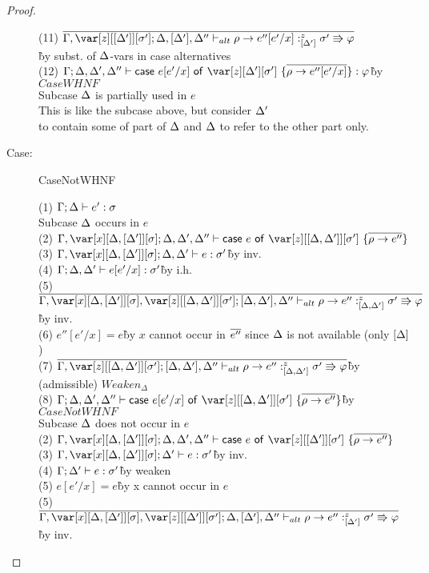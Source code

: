 \begin{proof}
\begin{description}
\begin{tabbing}
    (11) $\ov{\G,\z[\irr{\D'}][\s']; \D,[\D'],\D'' \vdash_{alt} \rho \to e''[e'/x] :^z_{\irr{\D'}} \s'\Rrightarrow\vp}$\\\` by subst. of $\Delta$-vars in case alternatives\\
    (12) $\G;\D,\D',\D'' \vdash \ccase{e[e'/x]}{\z[\D'][\s']~\{\ov{\rho \to e''[e'/x]}\}} : \vp$\` by $CaseWHNF$\\
    Subcase $\Delta$ is partially used in $e$\\
    This is like the subcase above, but consider $\Delta'$\\
    to contain some of part of $\Delta$ and $\Delta$ to refer to the other part only.
\end{tabbing}

\item[Case:] CaseNotWHNF
\begin{tabbing}
    (1) $\Gamma;\Delta\vdash e' :\sigma$\\
    Subcase $\Delta$ occurs in $e$\\
    (2) $\G,\xD; \D, \D', \D'' \vdash \ccase{e}{\z[\irr{\D,\D'}][\s']~\{\ov{\rho\to e''}\}}$\\
    (3) $\G,\xD; \D, \D' \vdash e : \s'$\` by inv.\\
    (4) $\Gamma; \Delta,\Delta' \vdash e[e'/x] : \sigma'$\` by i.h.\\
    (5) $\ov{\G,\xD,\z[\irr{\D,\D'}][\s']; [\D,\D'],\D'' \vdash_{alt} \rho \to e'' :^z_{\irr{\D,\D'}} \s'\Rrightarrow\vp}$\` by inv.\\
    (6) $e''[e'/x] = e$\` by $x$ cannot occur in $\overline{e''}$ since $\Delta$ is not available (only $\left[\Delta\right]$)\\
    (7) $\ov{\G,\z[\irr{\D,\D'}][\s']; [\D,\D'],\D'' \vdash_{alt} \rho \to e'' :^z_{\irr{\D,\D'}} \s'\Rrightarrow\vp}$\` by (admissible) $Weaken_\Delta$\\
    (8) $\G; \D, \D', \D'' \vdash \ccase{e[e'/x]}{\z[\irr{\D,\D'}][\s']~\{\ov{\rho\to e''}\}}$\`by $CaseNotWHNF$\\
    Subcase $\Delta$ does not occur in $e$\\
    (2) $\G,\xD; \D, \D', \D'' \vdash \ccase{e}{\z[\irr{\D'}][\s']~\{\ov{\rho\to e''}\}}$\\
    (3) $\G,\xD; \D' \vdash e : \s'$\` by inv.\\
    (4) $\Gamma; \Delta' \vdash e : \sigma'$\` by weaken\\
    (5) $e[e'/x] = e$\` by x cannot occur in $e$\\
    (5) $\ov{\G,\xD,\z[\irr{\D'}][\s']; \D,[\D'],\D'' \vdash_{alt} \rho \to e'' :^z_{\irr{\D'}} \s'\Rrightarrow\vp}$\` by inv.\\

\end{tabbing}
\end{description}
\end{proof}
